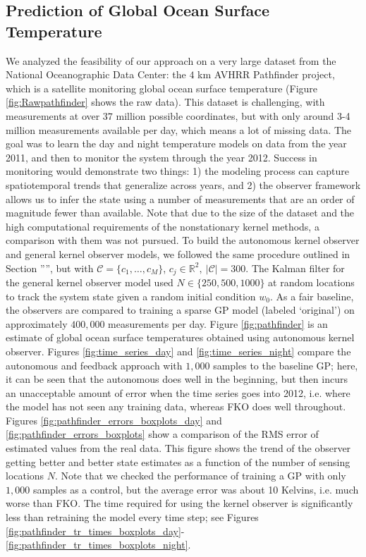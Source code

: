 \documentclass[letterpaper,12pt,peerreviewca,draftcls]{IEEEtran}
\newcommand{\R}{\mathbb{R}}
\newcommand{\weight}{w}
\newcommand{\nsamp}{N}
\newcommand{\ncent}{M}
\newcommand{\shCent}{\mathcal{C}}
\newcommand{\shCentLong}{\{c_1,\dots,c_{\ncent}\}}
\newcommand{\centind}{j}
\begin{document}
\subsection{Prediction of Global Ocean Surface Temperature}\label{sec:avhhr}

We analyzed the feasibility of our approach on a very large dataset from the National Oceanographic Data Center: the $4$ km AVHRR Pathfinder project, which is a satellite monitoring global ocean surface temperature (Figure \ref{fig:Rawpathfinder} shows the raw data). This dataset is challenging, with measurements at over $37$ million possible coordinates, but with only around 3-4 million measurements available per day, which means a lot of missing data. The goal was to learn the day and night temperature models on data from the year 2011, and then to monitor the system through the year 2012. Success in monitoring would demonstrate two things: 1) the modeling process can capture spatiotemporal trends that generalize across years, and 2) the observer framework allows us to infer the state using a number of measurements that are an order of magnitude fewer than available. Note that due to the size of the dataset and the high computational requirements of the nonstationary kernel methods, a comparison with them was not pursued. To build the autonomous kernel observer and general kernel observer models, we followed the same procedure outlined in Section '''', but with $\shCent=\shCentLong$, $c_{\centind}\in\R^{2}, \ |\shCent| = 300$. The Kalman filter for the general kernel observer model  used $\nsamp \in \{250,500,1000\}$ at random locations to track the system state given a random initial condition $\weight_0$. As a fair baseline, the observers are compared to training a sparse GP model (labeled `original')  on approximately $400,000$ measurements per day. %
Figure \ref{fig:pathfinder} is an estimate of global ocean surface temperatures obtained using autonomous kernel observer.
Figures \ref{fig:time_series_day} and \ref{fig:time_series_night} compare the autonomous and feedback approach with $1,000$ samples to the baseline GP; here, it can be seen that the autonomous does well in the beginning, but then incurs an unacceptable amount of error when the time series goes into 2012, i.e. where the model has not seen any training data, whereas FKO does well throughout. 
Figures %
\ref{fig:pathfinder_errors_boxplots_day} 
and %
\ref{fig:pathfinder_errors_boxplots} 
show a  comparison of the RMS error of estimated values from the real data.
This figure shows the trend of the observer getting better and better state estimates as a function of the number of sensing locations $\nsamp$. Note that we checked the performance of training a GP with only $1,000$ samples as a control, but the average error was about 10 Kelvins, i.e. much worse than FKO.
The time required for using the kernel observer is significantly less than retraining the model every time step; see Figures %
 \ref{fig:pathfinder_tr_times_boxplots_day}-\ref{fig:pathfinder_tr_times_boxplots_night}.
 
\end{document}
